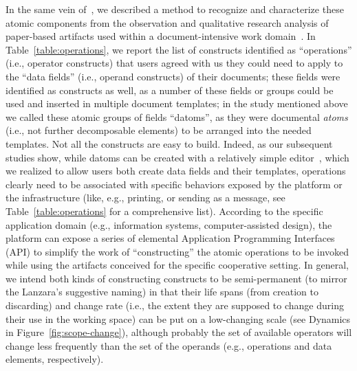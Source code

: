 \documentclass{article}
\begin{document}
In the same vein of~\citet{simone_computational_1993}, we described a method to recognize and characterize these atomic components from the observation and qualitative research analysis of paper-based artifacts used within a document-intensive work domain~\citep[i.e., two large hospitals ][]{cabitza_remain_2011}. In Table~\ref{table:operations}, we report the list of constructs identified as ``operations'' (i.e., operator constructs) that users agreed with us they could need to apply to the ``data fields'' (i.e., operand constructs) of their documents; these fields were identified as constructs as well, as a number of these fields or groups could be used and inserted in multiple document templates; in the study mentioned above we called these atomic groups of fields ``datoms'', as they were documental \emph{atoms} (i.e., not further decomposable elements) to be arranged into the needed templates. Not all the constructs are easy to build. Indeed, as our subsequent studies show, while datoms can be created with a relatively simple editor~\citep{cabitza_tailorable_2011}, which we realized to allow users both create data fields and their templates, operations clearly need to be associated with specific behaviors exposed by the platform or the infrastructure (like, e.g., printing, or sending as a message, see Table~\ref{table:operations} for a comprehensive list). According to the specific application domain (e.g., information systems, computer-assisted design), the platform can expose a series of elemental Application Programming Interfaces (API) to simplify the work of ``constructing'' the atomic operations to be invoked while using the artifacts conceived for the specific cooperative setting. In general, we intend both kinds of constructing constructs to be semi-permanent (to mirror the Lanzara's suggestive naming) in that their life spans (from creation to discarding) and change rate (i.e., the extent they are supposed to change during their use in the working space) can be put on a low-changing scale (see Dynamics in Figure~\ref{fig:scope-change}), although probably the set of available operators will change less frequently than the set of the operands (e.g., operations and data elements, respectively).
\end{document}
